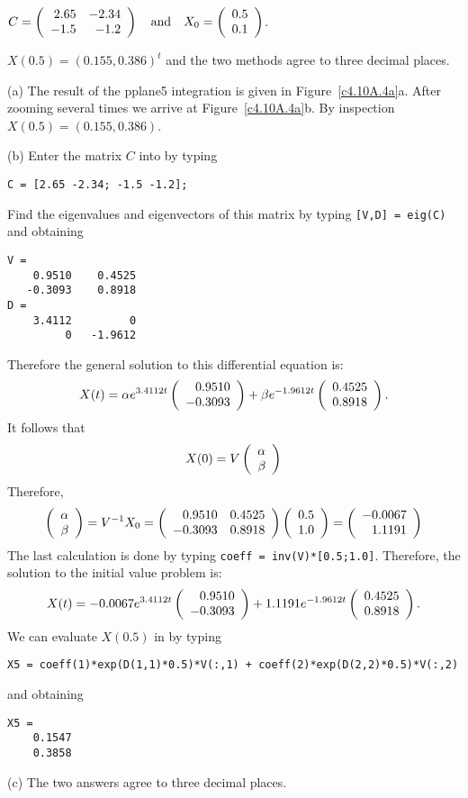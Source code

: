 \documentclass{ximera}
\begin{document}
\begin{exercise}  \label{c4.10A.4a}  
$C = \left(\begin{array}{rr} 2.65 & -2.34\\ -1.5 &-1.2\end{array}\right) \quad\mbox{and}\quad X_0=\left(\begin{array}{r} 0.5 \\ 0.1\end{array}\right)$.

\begin{solution}
\ans $X(0.5) = (0.155,0.386)^t$ and the two methods agree to three 
decimal places.

\soln (a) The result of the {\sf pplane5} integration is given in 
Figure~\ref{c4.10A.4a}a. After zooming several times we arrive at
Figure~\ref{c4.10A.4a}b.  By inspection $X(0.5)=(0.155,0.386)$.

(b)  Enter the matrix $C$ into \Matlab by typing
\begin{verbatim}
C = [2.65 -2.34; -1.5 -1.2];
\end{verbatim}
Find the eigenvalues and eigenvectors of this matrix by typing {\tt [V,D] = eig(C)}
and obtaining
\begin{verbatim}
V =
    0.9510    0.4525
   -0.3093    0.8918
D =
    3.4112         0
         0   -1.9612
\end{verbatim}
Therefore the general solution to this differential equation is:
\[
X(t) = \alpha e^{3.4112 t}\left(\begin{array}{r} 0.9510 \\ -0.3093\end{array}\right) +
\beta e^{-1.9612 t}\left(\begin{array}{r} 0.4525 \\ 0.8918\end{array}\right).
\]
It follows that 
\[
X(0) = V \left(\begin{array}{r} \alpha \\ \beta\end{array}\right)
\]
Therefore,
\[
\left(\begin{array}{r} \alpha \\ \beta\end{array}\right) = V^{-1} X_0 = 
\left(\begin{array}{rr} 0.9510 & 0.4525\\ -0.3093 &0.8918\end{array}\right)\left(\begin{array}{r} 0.5 \\ 1.0\end{array}\right) = \left(\begin{array}{r} -0.0067 \\ 1.1191\end{array}\right)
\]
The last calculation is done by typing {\tt coeff = inv(V)*[0.5;1.0]}. 
Therefore, the solution to the initial value problem is:
\[
X(t) = -0.0067e^{3.4112 t}\left(\begin{array}{r} 0.9510 \\ -0.3093\end{array}\right) +
1.1191e^{-1.9612 t}\left(\begin{array}{r} 0.4525 \\ 0.8918\end{array}\right).
\]
We can evaluate $X(0.5)$ in \Matlab by typing
\begin{verbatim}
X5 = coeff(1)*exp(D(1,1)*0.5)*V(:,1) + coeff(2)*exp(D(2,2)*0.5)*V(:,2)
\end{verbatim}
and obtaining
\begin{verbatim}
X5 =
    0.1547
    0.3858
\end{verbatim}


(c)  The two answers agree to three decimal places.

\begin{figure}[htb]
                       \centerline{%
                       }
\end{figure}



\end{solution}
\end{exercise}
\end{document}
